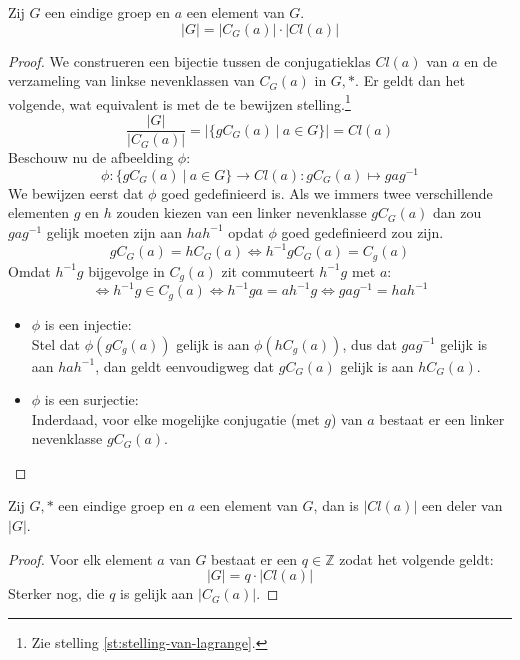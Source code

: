 \documentclass[main.tex]{subfiles}
\begin{document}
\begin{st}
  \label{st:orde-conjugatieklasse-centralisator}
  Zij $G$ een eindige groep en $a$ een element van $G$.
  \[ |G| = |C_{G}(a)|\cdot|Cl(a)| \]

  \begin{proof}
    We construeren een bijectie tussen de conjugatieklas $Cl(a)$ van $a$ en de verzameling van linkse nevenklassen van $C_{G}(a)$ in $G,*$.
    Er geldt dan het volgende, wat equivalent is met de te bewijzen stelling.\footnote{Zie stelling \ref{st:stelling-van-lagrange}.}
    \[ \frac{|G|}{|C_{G}(a)|} = |\{ gC_{G}(a) \ |\ a \in G \}| = Cl(a) \]
    Beschouw nu de afbeelding $\phi$:
    \[ \phi: \{ gC_{G}(a) \ |\ a \in G \} \rightarrow Cl(a): gC_{G}(a) \mapsto gag^{-1} \]
    We bewijzen eerst dat $\phi$ goed gedefinieerd is.
    Als we immers twee verschillende elementen $g$ en $h$ zouden kiezen van een linker nevenklasse $gC_{G}(a)$ dan zou $gag^{-1}$ gelijk moeten zijn aan $hah^{-1}$ opdat $\phi$ goed gedefinieerd zou zijn.
    \[ gC_{G}(a) = hC_{G}(a) \Leftrightarrow h^{-1}gC_{G}(a) = C_{g}(a) \]
    Omdat $h^{-1}g$ bijgevolge in $C_{g}(a)$ zit commuteert $h^{-1}g$ met $a$:
    \[ \Leftrightarrow h^{-1}g \in C_{g}(a) \Leftrightarrow h^{-1}ga = ah^{-1}g \Leftrightarrow gag^{-1} = hah^{-1} \]
    \begin{itemize}
    \item $\phi$ is een injectie:\\
      Stel dat $\phi(gC_{g}(a))$ gelijk is aan $\phi(hC_{g}(a))$, dus dat $gag^{-1}$ gelijk is aan $hah^{-1}$, dan geldt eenvoudigweg dat $gC_{G}(a)$ gelijk is aan $hC_{G}(a)$.
    \item $\phi$ is een surjectie:\\
      Inderdaad, voor elke mogelijke conjugatie (met $g$) van $a$ bestaat er een linker nevenklasse $gC_{G}(a)$.
    \end{itemize}
  \end{proof}
\end{st}

\begin{gev}
  \label{gev:orde-conjugatieklasse-deelt-orde-groep}
  Zij $G,*$ een eindige groep en $a$ een element van $G$, dan is $|Cl(a)|$ een deler van $|G|$.
  
  \begin{proof}
    Voor elk element $a$ van $G$ bestaat er een $q \in \mathbb{Z}$ zodat het volgende geldt:
    \[ |G| = q \cdot |Cl(a)| \]
    Sterker nog, die $q$ is gelijk aan $|C_{G}(a)|$.
  \end{proof}
\end{gev}
\end{document}
